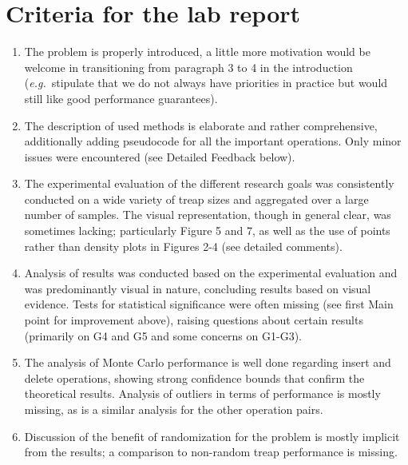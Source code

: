 \documentclass[11pt,a4paper,oneside,fleqn]{article}
\newcommand{\eg}{\emph{e.g.}~}
\begin{document}
\section*{Criteria for the lab report}
\begin{enumerate}[topsep=0pt,itemsep=-1ex,partopsep=1ex,parsep=1ex]
\item The problem is properly introduced, a little more motivation would be welcome in transitioning from paragraph 3 to 4 in the introduction (\eg stipulate that we do not always have priorities in practice but would still like good performance guarantees). 
\item The description of used methods is elaborate and rather comprehensive, additionally adding pseudocode for all the important operations. Only minor issues were encountered (see Detailed Feedback below).
\item The experimental evaluation of the different research goals was consistently conducted on a wide variety of treap sizes and aggregated over a large number of samples. The visual representation, though in general clear, was sometimes lacking; particularly Figure 5 and 7, as well as the use of points rather than density plots in Figures 2-4 (see detailed comments).
\item Analysis of results was conducted based on the experimental evaluation and was predominantly visual in nature, concluding results based on visual evidence. Tests for statistical significance were often missing (see first Main point for improvement above), raising questions about certain results (primarily on G4 and G5 and some concerns on G1-G3).
\item The analysis of Monte Carlo performance is well done regarding insert and delete operations, showing strong confidence bounds that confirm the theoretical results. Analysis of outliers in terms of performance is mostly missing, as is a similar analysis for the other operation pairs.
\item Discussion of the benefit of randomization for the problem is mostly implicit from the results; a comparison to non-random treap performance is missing.
\end{enumerate}
\end{document}
